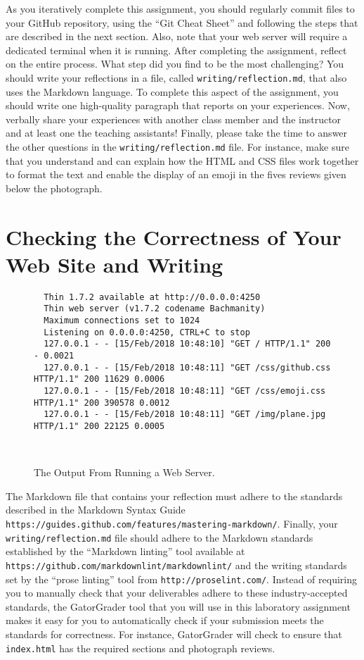 \documentclass[11pt]{article}
\newcommand{\mainprogram}{\lstinline{index.html}}
\newcommand{\reflection}{\lstinline{writing/reflection.md}}
\newcommand{\url}[1]{\lstinline{#1}}
\newcommand{\step}[1]{``{#1}''}
\begin{document}
As you iteratively complete this assignment, you should regularly commit files
to your GitHub repository, using the ``Git Cheat Sheet'' and following the steps
that are described in the next section. Also, note that your web server will
require a dedicated terminal when it is running. After completing the
assignment, reflect on the entire process. What step did you find to be the most
challenging? You should write your reflections in a file, called \reflection{},
that also uses the Markdown language. To complete this aspect of the assignment,
you should write one high-quality paragraph that reports on your experiences.
Now, verbally share your experiences with another class member and the
instructor and at least one the teaching assistants! Finally, please take the
time to answer the other questions in the \reflection{} file. For instance, make
sure that you understand and can explain how the HTML and CSS files work
together to format the text and enable the display of an emoji in the fives
reviews given below the photograph.

\section*{Checking the Correctness of Your Web Site and Writing}

\begin{figure}[t]
  \centering
  \begin{verbatim}
  Thin 1.7.2 available at http://0.0.0.0:4250
  Thin web server (v1.7.2 codename Bachmanity)
  Maximum connections set to 1024
  Listening on 0.0.0.0:4250, CTRL+C to stop
  127.0.0.1 - - [15/Feb/2018 10:48:10] "GET / HTTP/1.1" 200 - 0.0021
  127.0.0.1 - - [15/Feb/2018 10:48:11] "GET /css/github.css HTTP/1.1" 200 11629 0.0006
  127.0.0.1 - - [15/Feb/2018 10:48:11] "GET /css/emoji.css HTTP/1.1" 200 390578 0.0012
  127.0.0.1 - - [15/Feb/2018 10:48:11] "GET /img/plane.jpg HTTP/1.1" 200 22125 0.0005
  \end{verbatim}
  \vspace*{-.35in}
  \caption{The Output From Running a Web Server.}~\label{fig:output}
  \vspace*{-.25in}
\end{figure}

The Markdown file that contains your reflection must adhere to the standards
described in the Markdown Syntax Guide
\url{https://guides.github.com/features/mastering-markdown/}. Finally, your
\reflection{} file should adhere to the Markdown standards established by the
\step{Markdown linting} tool available at
\url{https://github.com/markdownlint/markdownlint/} and the writing standards
set by the \step{prose linting} tool from \url{http://proselint.com/}. Instead
of requiring you to manually check that your deliverables adhere to these
industry-accepted standards, the GatorGrader tool that you will use in this
laboratory assignment makes it easy for you to automatically check if your
submission meets the standards for correctness. For instance, GatorGrader will
check to ensure that \mainprogram{} has the required sections and photograph
reviews.
\end{document}
